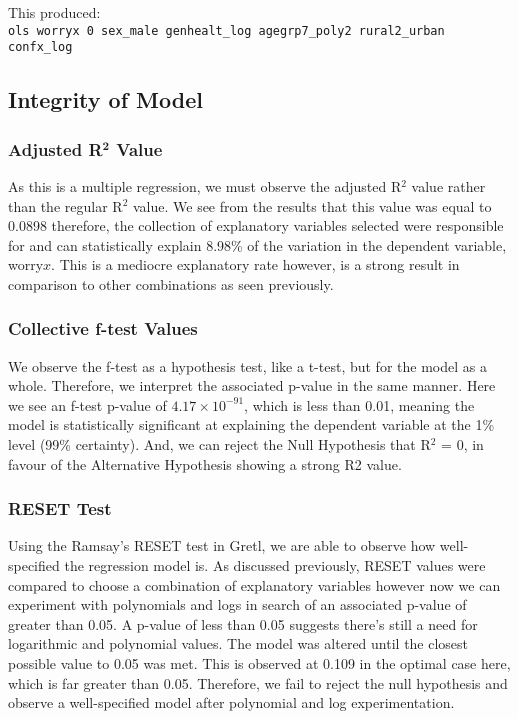 \documentclass[11pt, english]{article}
\begin{document}
	This produced:\\

	\verb|ols worryx 0 sex_male genhealt_log agegrp7_poly2 rural2_urban confx_log|

	\newpage

	\subsection{Integrity of Model}

		\subsubsection{Adjusted R$\mathbf{^2}$ Value}

	As this is a multiple regression, we must observe the adjusted R$^2$ value rather than the regular R$^2$ value. We see from the results that this value was equal to 0.0898 therefore, the collection of explanatory variables selected were responsible for and can statistically explain 8.98\% of the variation in the dependent variable, worry$x$. This is a mediocre explanatory rate however, is a strong result in comparison to other combinations as seen previously.

		\subsubsection{Collective f-test Values}

	We observe the f-test as a hypothesis test, like a t-test, but for the model as a whole. Therefore, we interpret the associated p-value in the same manner. Here we see an f-test p-value of $4.17\times{10}^{-91}$, which is less than 0.01, meaning the model is statistically significant at explaining the dependent variable at the 1\% level (99\% certainty). And, we can reject the Null Hypothesis that R$^2$ = 0, in favour of the Alternative Hypothesis showing a strong R2 value. 

		\subsubsection{RESET Test}

	Using the Ramsay’s RESET test in Gretl, we are able to observe how well-specified the regression model is. As discussed previously, RESET values were compared to choose a combination of explanatory variables however now we can experiment with polynomials and logs in search of an associated p-value of greater than 0.05. A p-value of less than 0.05 suggests there’s still a need for logarithmic and polynomial values. The model was altered until the closest possible value to 0.05 was met. This is observed at 0.109 in the optimal case here, which is far greater than 0.05. Therefore, we fail to reject the null hypothesis and observe a well-specified model after polynomial and log experimentation.
\end{document}
